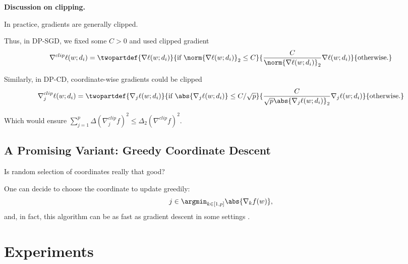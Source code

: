 \documentclass[notheorems]{beamer}
\begin{document}
\begin{frame}
  \textbf{Discussion on clipping.}

  In practice, gradients are generally clipped.

  Thus, in DP-SGD, we fixed some $C > 0$ and used clipped gradient
  \begin{align*}
    \nabla^{clip} \ell(w; d_i) = \twopartdef
    {\nabla \ell(w; d_i)}{\text{if } \norm{\nabla \ell(w; d_i)}_2 \le C}
    {\frac{C}{\norm{\nabla \ell(w; d_i)}_2} \nabla \ell(w; d_i)}{\text{otherwise}.}
  \end{align*}

  Similarly, in DP-CD, coordinate-wise gradients could be clipped
  \begin{align*}
    \nabla^{clip}_j \ell(w; d_i) = \twopartdef
    {\nabla_j \ell(w; d_i)}{\text{if } \abs{\nabla_j \ell(w; d_i)} \le C/\sqrt{p}}
    {\frac{C}{\sqrt{p}\abs{\nabla_j \ell(w; d_i)}_2} \nabla_j \ell(w; d_i)}{\text{otherwise}.}
  \end{align*}

  Which would ensure $\sum_{j=1}^p \Delta(\nabla_j^{clip}f)^2 \le \Delta_2(\nabla^{clip} f)^2$.
\end{frame}

\subsection{A Promising Variant: Greedy Coordinate Descent}
\label{sub:a_promising_variant_greedy_coordinate_descent}

\begin{frame}
  Is random selection of coordinates really that good?

  \vspace{1em}

  One can decide to choose the coordinate to update greedily:
  \begin{align*}
    j \in \argmin_{k \in [1, p]} \abs{\nabla_k f(w)},
  \end{align*}
  and, in fact, this algorithm can be as fast as gradient descent in some settings .
\end{frame}



\section{Experiments}
\label{sec:experiments}
\end{document}
